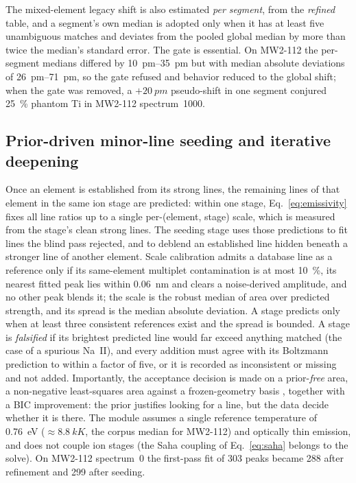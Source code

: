 The mixed-element legacy shift is also estimated \emph{per segment}, from the
\emph{refined} table, and a segment's own median is adopted only when it
has at least five unambiguous matches and deviates from the pooled global median by more
than twice the median's standard error.
The gate is essential.
On MW2-112 the per-segment medians differed by \SIrange{10}{35}{pm} but with
median absolute deviations of \SIrange{26}{71}{pm}, so the gate refused and behavior reduced to
the global shift; when the gate was removed, a $+\SI{20}{pm}$ pseudo-shift in one segment
conjured \SI{25}{\percent} phantom Ti in MW2-112 spectrum~1000.

\subsection{Prior-driven minor-line seeding and iterative deepening}
\label{sec:wf-seeding}

Once an element is established from its strong lines, the remaining lines of that element
in the same ion stage are predicted: within one stage, Eq.~\eqref{eq:emissivity} fixes all
line ratios up to a single per-(element, stage) scale, which is measured from the
stage's clean strong lines.
The seeding stage uses those predictions to fit lines the blind pass rejected, and to
deblend an established line hidden beneath a stronger line of another element.
Scale calibration admits a database line as a reference only if its same-element multiplet
contamination is at most \SI{10}{\percent}, its nearest fitted peak lies within \SI{0.06}{nm} and
clears a noise-derived amplitude, and no other peak blends it; the scale is the robust
median of area over predicted strength, and its spread is the median absolute deviation.
A stage predicts only when at least three consistent references exist and the spread is
bounded.
A stage is \emph{falsified} if its brightest predicted line would far exceed anything matched
(the case of a spurious Na~II), and every addition must agree with its Boltzmann prediction
to within a factor of five, or it is recorded as inconsistent or missing and not added.
Importantly, the acceptance decision is made on a prior-\emph{free} area, a non-negative
least-squares area against a frozen-geometry basis \citep{lawson1995nnls}, together with a
BIC improvement: the prior justifies looking for a line, but the data decide whether it is
there.
The module assumes a single reference temperature of \SI{0.76}{eV} ($\approx\SI{8.8}{kK}$,
the corpus median for MW2-112) and optically thin emission, and does not couple ion stages
(the Saha coupling of Eq.~\eqref{eq:saha} belongs to the solve).
On MW2-112 spectrum~0 the first-pass fit of 303 peaks became 288 after refinement and 299
after seeding.

